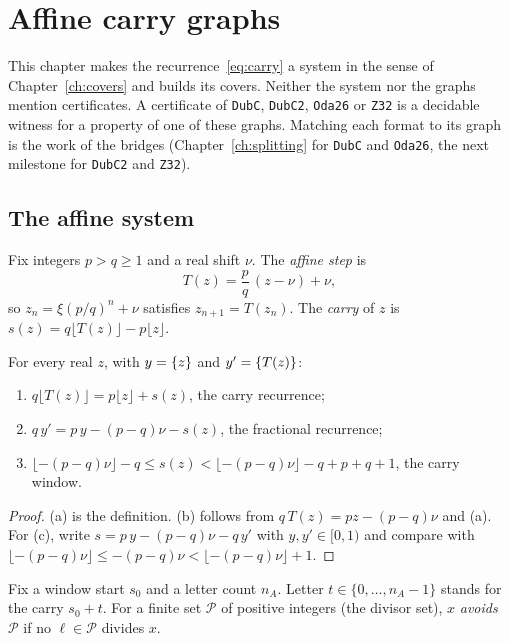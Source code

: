 \chapter{Affine carry graphs}\label{ch:affine}

This chapter makes the recurrence~\eqref{eq:carry} a system in the sense of
Chapter~\ref{ch:covers} and builds its covers. Neither the system nor the graphs mention
certificates. A certificate of \texttt{DubC}, \texttt{DubC2}, \texttt{Oda26} or \texttt{Z32} is
a decidable witness for a property of one of these graphs. Matching each format to its graph
is the work of the bridges (Chapter~\ref{ch:splitting} for \texttt{DubC} and \texttt{Oda26},
the next milestone for \texttt{DubC2} and \texttt{Z32}).

\section{The affine system}

Fix integers \(p>q\ge1\) and a real shift \(\nu\). The \emph{affine step} is
\[
T(z)=\frac pq\,(z-\nu)+\nu,
\]
so \(z_n=\xi(p/q)^n+\nu\) satisfies \(z_{n+1}=T(z_n)\). The \emph{carry} of \(z\) is
\(s(z)=q\lfloor T(z)\rfloor-p\lfloor z\rfloor\).

\begin{lemma}\label{lem:affine}
For every real \(z\), with \(y=\{z\}\) and \(y'=\{T(z)\}\):
\begin{enumerate}[label=(\alph*)]
\item \(q\lfloor T(z)\rfloor=p\lfloor z\rfloor+s(z)\), the carry recurrence;
\item \(q\,y'=p\,y-(p-q)\nu-s(z)\), the fractional recurrence;
\item \(\lfloor-(p-q)\nu\rfloor-q\le s(z)<\lfloor-(p-q)\nu\rfloor-q+p+q+1\), the carry window.
\end{enumerate}
\end{lemma}

\begin{proof}
(a) is the definition. (b) follows from \(q\,T(z)=pz-(p-q)\nu\) and (a). For (c), write
\(s=p\,y-(p-q)\nu-q\,y'\) with \(y,y'\in[0,1)\) and compare with
\(\lfloor-(p-q)\nu\rfloor\le-(p-q)\nu<\lfloor-(p-q)\nu\rfloor+1\).
\end{proof}

Fix a window start \(s_0\) and a letter count \(n_A\). Letter \(t\in\{0,\dots,n_A-1\}\) stands
for the carry \(s_0+t\). For a finite set \(\mathcal P\) of positive integers (the divisor set),
\(x\) \emph{avoids} \(\mathcal P\) if no \(\ell\in\mathcal P\) divides \(x\).

